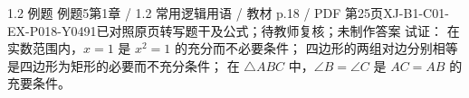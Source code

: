 \par\noindent\begin{minipage}{\linewidth}
\begin{bankitem}{1.2 例题 例题5}{第1章 / 1.2 常用逻辑用语 / 教材 p.18 / PDF 第25页}{XJ-B1-C01-EX-P018-Y0491}{已对照原页转写题干及公式；待教师复核；未制作答案}
试证：
在实数范围内，$x=1$ 是 $x^2=1$ 的充分而不必要条件；
四边形的两组对边分别相等是四边形为矩形的必要而不充分条件；
在 $\triangle ABC$ 中，$\angle B=\angle C$ 是 $AC=AB$ 的充要条件。
\end{bankitem}
\end{minipage}\par\medskip
